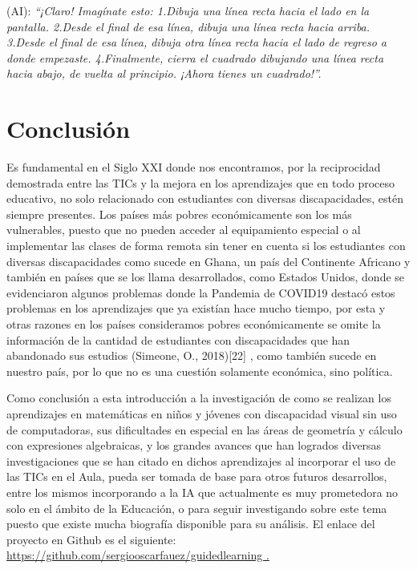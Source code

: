 \documentclass{article}
\begin{document}
\begin{figure}[h] %
	\vspace{-0.90cm}
\end{figure}


\vspace{-1cm}

{\changefontsizes{8.8pt}
(AI): \textit{“¡Claro! Imagínate esto:
1.Dibuja una línea recta hacia el lado en la pantalla.
2.Desde el final de esa línea, dibuja una línea recta hacia arriba.
3.Desde el final de esa línea, dibuja otra línea recta hacia el lado de regreso a donde empezaste.
4.Finalmente, cierra el cuadrado dibujando una línea recta hacia abajo, de vuelta al principio.
¡Ahora tienes un cuadrado!”.}}



\section{\fontsize{12pt}{14pt} Conclusión}

{\changefontsizes{8.8pt}
Es fundamental en el Siglo XXI donde nos encontramos, por la reciprocidad demostrada entre las TICs y la mejora en los aprendizajes que en todo proceso educativo, no solo relacionado con estudiantes con diversas discapacidades, estén siempre presentes. Los países más pobres económicamente son los más vulnerables, puesto que no pueden acceder al equipamiento especial o al implementar las clases de forma remota sin tener en cuenta si los estudiantes con diversas discapacidades como sucede en Ghana, un país del Continente Africano y también en países que se los llama desarrollados, como Estados Unidos, donde se evidenciaron algunos problemas donde la Pandemia de COVID19 destacó estos problemas en los aprendizajes que ya existían hace mucho tiempo, por esta y otras razones en los países consideramos pobres económicamente se omite la información de la cantidad de estudiantes con discapacidades que han abandonado sus estudios (Simeone, O., 2018)[22] , como también sucede en nuestro país, por lo que no es una cuestión solamente económica, sino política.

Como conclusión a esta introducción a la investigación de como se realizan los aprendizajes en matemáticas en niños y jóvenes con discapacidad visual sin uso de computadoras, sus dificultades en especial en las áreas de geometría y cálculo con expresiones algebraicas, y los grandes avances que han logrados diversas investigaciones que se han citado en dichos aprendizajes al incorporar el uso de las TICs en el Aula, pueda ser tomada de base para otros futuros desarrollos, entre los mismos incorporando a la IA que actualmente es muy prometedora no solo en el ámbito de la Educación, o para seguir investigando sobre este tema puesto que existe mucha biografía disponible para su análisis. El enlace del proyecto en Github es el siguiente: \url{ https://github.com/sergiooscarfauez/guidedlearning .}}
\end{document}
